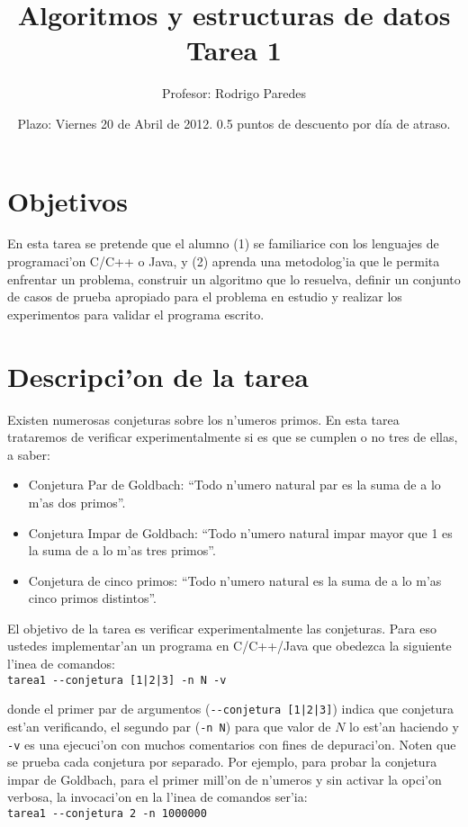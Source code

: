 \label{•} \documentclass[11pt]{utalcaDoc}
\title{{\bf Algoritmos y estructuras de datos}\\Tarea 1}
\author{Profesor: Rodrigo Paredes}
\date{Plazo: Viernes 20 de Abril de 2012. 0.5 puntos de descuento por d\'ia de atraso.}
\begin{document}
\renewcommand{\figurename}{Figura~}
\renewcommand{\tablename}{Tabla~}

\maketitle

\section{Objetivos}
 
En esta tarea se pretende que el alumno (1) se familiarice con los lenguajes
de programaci'on C/C++ o Java, y (2) aprenda una metodolog'ia
que le permita enfrentar un problema, construir un algoritmo que lo resuelva,
definir un conjunto de casos de prueba apropiado para el problema en estudio
y realizar los experimentos para validar el programa escrito.
 


\section{Descripci'on de la tarea}

Existen numerosas conjeturas sobre los n'umeros primos. En esta tarea trataremos
de verificar experimentalmente si es que se cumplen o no tres de ellas, a saber:
\begin{itemize}
\item Conjetura Par de Goldbach: ``Todo n'umero natural par es la suma de a lo m'as
dos primos''.
\item Conjetura Impar de Goldbach: ``Todo n'umero natural impar mayor que 1
es la suma de a lo m'as tres primos''.
\item Conjetura de cinco primos: ``Todo n'umero natural es la suma de a lo m'as cinco primos distintos''.
\end{itemize}


El objetivo de la tarea es verificar experimentalmente las conjeturas. Para eso
ustedes implementar'an un programa en C/C++/Java que obedezca la
siguiente l'inea de comandos:\\
\verb$tarea1 --conjetura [1|2|3] -n N -v$

donde el primer par de argumentos (\verb$--conjetura [1|2|3]$) indica que conjetura
est'an verificando, el segundo par (\verb|-n N|) para que valor de $N$ lo est'an haciendo
y \verb|-v| es una ejecuci'on con muchos comentarios con fines de depuraci'on.
Noten que se prueba cada conjetura por separado. Por ejemplo, para probar la
conjetura impar de Goldbach, para el primer mill'on de n'umeros y sin activar
la opci'on verbosa, la invocaci'on en la l'inea de comandos ser'ia:\\
\verb$tarea1 --conjetura 2 -n 1000000$
\end{document}
